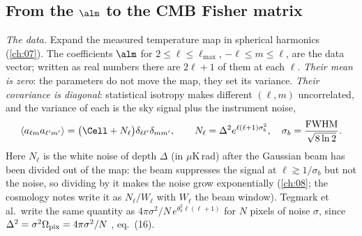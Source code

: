 \subsection{From the \texorpdfstring{$\alm$}{alm} to the CMB Fisher matrix}
\label{10a:sec:cmb-derive}

\emph{The data.} Expand the measured temperature map in spherical harmonics (\cref{ch:07}). The coefficients
$\alm$ for $2\le\ell\le\ell_{\max}$, $-\ell\le m\le\ell$, are the data vector; written as real numbers there are
$2\ell+1$ of them at each $\ell$. \emph{Their mean is zero}: the parameters do not move the map, they set its
variance. \emph{Their covariance is diagonal}: statistical isotropy makes different $(\ell,m)$ uncorrelated, and the
variance of each is the sky signal plus the instrument noise,
\begin{equation}
  \langle a_{\ell m}a_{\ell'm'}\rangle=\bigl(\Cell+N_\ell\bigr)\delta_{\ell\ell'}\delta_{mm'},
  \qquad
  N_\ell=\Delta^2e^{\ell(\ell+1)\sigma_b^2},\quad\sigma_b=\frac{\mathrm{FWHM}}{\sqrt{8\ln2}} .
  \label{10a:eq:alm-cov}
\end{equation}
Here $N_\ell$ is the white noise of depth $\Delta$ (in $\mu$K\,rad) after the Gaussian beam has been divided out of
the map: the beam suppresses the signal at $\ell\gtrsim1/\sigma_b$ but not the noise, so dividing by it makes the
noise grow exponentially (\cref{ch:08}; the cosmology notes write it as $N_\ell/W_\ell$ with $W_\ell$ the beam
window). Tegmark et al.\ write the same quantity as $4\pi\sigma^2/N\,e^{\theta_b^2\ell(\ell+1)}$ for $N$ pixels of noise
$\sigma$, since $\Delta^2=\sigma^2\Omega_{\rm pix}=4\pi\sigma^2/N$ \cite{TTH1997}, eq.~(16).

